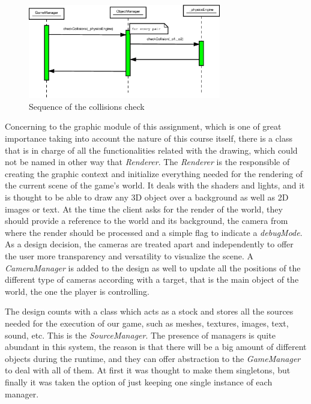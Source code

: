 \documentclass[]{article}
\begin{document}
\begin{figure}[h]
\begin{center}
\includegraphics[width=0.75\textwidth]{images/physicsEngineSec.eps}
\caption{Sequence of the collisions check}
\label{fig:pesec}
\end{center}
\end{figure}

Concerning to the graphic module of this assignment, which is one of great importance taking into account the nature of this course itself, there is a class that is in charge of all the functionalities
related with the drawing, which could not be named in other way that \emph{Renderer}. The \emph{Renderer} is the responsible of creating the graphic context and initialize everything needed for the
rendering of the current scene of the game's world. It deals with the shaders and lights, and it is thought to be able to draw any 3D object over a background as well as 2D images or text. At the time 
the client asks for the render of the world, they should provide a reference to the world and its background, the camera from where the render should be processed and a simple flag to indicate a \emph{debugMode}.
As a design decision, the cameras are treated apart and independently to offer the user more transparency and versatility to visualize the scene. A \emph{CameraManager} is added to the design as well to
update all the positions of the different type of cameras according with a target, that is the main object of the world, the one the player is controlling.

The design counts with a class which acts as a stock and stores all the sources needed for the execution of our game, such as meshes, textures, images, text, sound, etc. This is the 
\emph{SourceManager}. The presence of managers is quite abundant in this system, the reason is that there will be a big amount of different objects during the runtime, and they can offer abstraction
to the \emph{GameManager} to deal with all of them. At first it was thought to make them singletons, but finally it was taken the option of just keeping one single instance of each manager.
\end{document}
